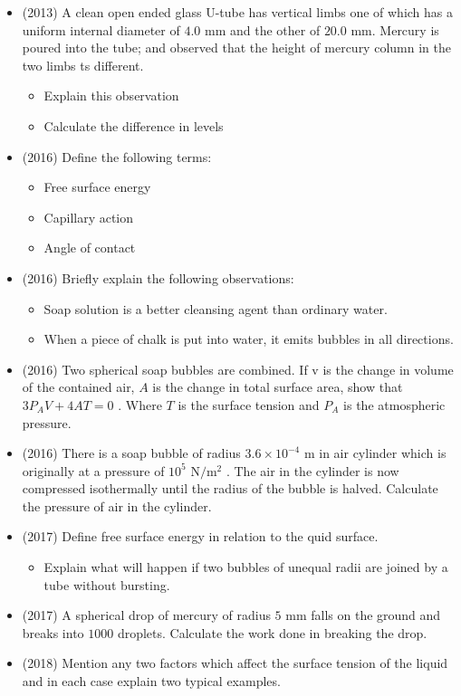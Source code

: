\documentclass{article}
\begin{document}
\begin{itemize}
\item (2013)  A clean open ended glass U-tube has vertical limbs one of which has a uniform internal diameter of $ 4.0$ mm and the other of $ 20.0$ mm. Mercury is poured into the tube; and observed that the height of mercury column in the two limbs ts different.
 \begin{itemize}
\item Explain this observation
\item Calculate the difference in levels
\end{itemize}
\item (2016)  Define the following terms:
 \begin{itemize}
\item Free surface energy
\item Capillary action
\item Angle of contact
\end{itemize}
\item (2016)  Briefly explain the following observations:
 \begin{itemize}
\item Soap solution is a better cleansing agent than ordinary water.
\item When a piece of chalk is put into water, it emits bubbles in all directions.
\end{itemize}
\item (2016)  Two spherical soap bubbles are combined.  If v is the change in volume of the contained air, $ A$ is the change in total surface area, show that $ 3P_{A}V+4A T=0$ . Where $ T$ is the surface tension and $ P_{A}$ is the atmospheric pressure.
\item (2016)  There is a soap bubble of radius $ 3.6 \times 10^{-4}$ m in air cylinder which is originally at a pressure of $ 10^{5}$ N$/$m$ ^{2}$ . The air in the cylinder is now compressed isothermally until the radius of the bubble is halved. Calculate the pressure of air in the cylinder.
\item (2017)  Define free surface energy in relation to the quid surface.
 \begin{itemize}
\item Explain what will happen if two bubbles of unequal radii are joined by a tube without bursting. 
\end{itemize}
\item (2017)  A spherical drop of mercury of radius $ 5$ mm falls on the ground and breaks into $ 1000$ droplets. Calculate the work done in breaking the drop. 
\item (2018)  Mention any two factors which affect the surface tension of the liquid and in each case explain two typical examples. 

\end{itemize}
\end{document}
